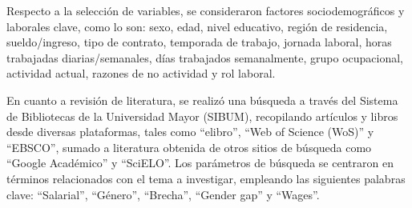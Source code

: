Respecto a la selección de variables, se consideraron factores sociodemográficos y laborales clave, como lo son: sexo, edad, nivel educativo, región de residencia, sueldo/ingreso, tipo de contrato, temporada de trabajo, jornada laboral, horas trabajadas diarias/semanales, días trabajados semanalmente, grupo ocupacional, actividad actual, razones de no actividad y rol laboral.

En cuanto a revisión de literatura, se realizó una búsqueda a través del Sistema de Bibliotecas de la Universidad Mayor (SIBUM), recopilando artículos y libros desde diversas plataformas, tales como ``elibro'', ``Web of Science (WoS)'' y ``EBSCO'', sumado a literatura obtenida de otros sitios de búsqueda como ``Google Académico'' y ``SciELO''. Los parámetros de búsqueda se centraron en términos relacionados con el tema a investigar, empleando las siguientes palabras clave: ``Salarial'', ``Género'', ``Brecha'', ``Gender gap'' y ``Wages''. 




	
	


